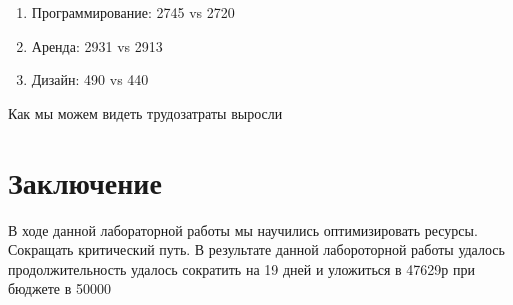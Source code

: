 \begin{enumerate}
	\item Программирование: 2745 vs 2720
	\item Аренда: 2931 vs 2913
	\item Дизайн: 490 vs 440
\end{enumerate}

Как мы можем видеть трудозатраты выросли

\section{Заключение}
В ходе данной лабораторной работы мы научились оптимизировать ресурсы. Сокращать критический путь.
В результате данной лабороторной работы удалось продолжительность удалось сократить на 19 дней и уложиться в 47629р при бюджете в 50000


















